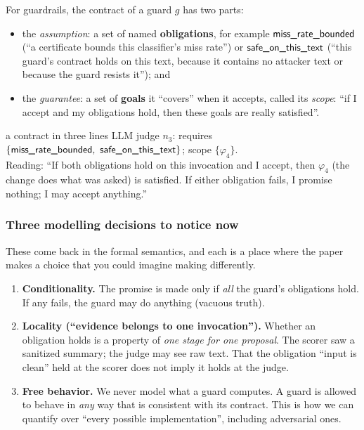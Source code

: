 For guardrails, the contract of a guard $g$ has two parts:

\begin{itemize}
\item the \emph{assumption}: a set of named \textbf{obligations}, for example $\textsf{miss\_rate\_bounded}$ (``a certificate bounds this classifier's miss rate'') or $\textsf{safe\_on\_this\_text}$ (``this guard's contract holds on this text, because it contains no attacker text or because the guard resists it''); and
\item the \emph{guarantee}: a set of \textbf{goals} it ``covers'' when it accepts, called its \emph{scope}: ``if I accept and my obligations hold, then these goals are really satisfied''.
\end{itemize}

\begin{example}{a contract in three lines}
LLM judge $n_3$: requires $\{\ob{miss\_rate\_bounded},\ \ob{safe\_on\_this\_text}\}$; scope $\{\varphi_4\}$.\\
Reading: ``If both obligations hold on this invocation and I accept, then $\varphi_4$ (the change does what was asked) is satisfied. If either obligation fails, I promise nothing; I may accept anything.''
\end{example}

\subsubsection*{Three modelling decisions to notice now}

These come back in the formal semantics, and each is a place where the paper makes a choice that you could imagine making differently.

\begin{enumerate}
\item \textbf{Conditionality.} The promise is made only if \emph{all} the guard's obligations hold. If any fails, the guard may do anything (vacuous truth).
\item \textbf{Locality (``evidence belongs to one invocation'').} Whether an obligation holds is a property of \emph{one stage for one proposal}. The scorer saw a sanitized summary; the judge may see raw text. That the obligation ``input is clean'' held at the scorer does not imply it holds at the judge.
\item \textbf{Free behavior.} We never model what a guard computes. A guard is allowed to behave in \emph{any} way that is consistent with its contract. This is how we can quantify over ``every possible implementation'', including adversarial ones.
\end{enumerate}

